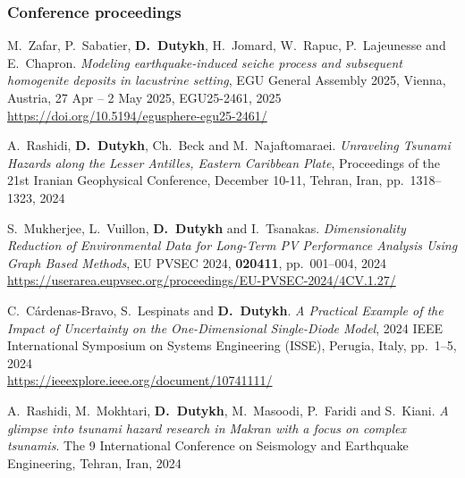 \documentclass[final, a4paper, oneside, 12pt]{article}
\numberwithin{equation}{section}
\begin{document}
\subsubsection{Conference proceedings}

\begin{etaremune}



  \item M.~Zafar, P.~Sabatier, \textbf{D.~Dutykh}, H.~Jomard, W.~Rapuc, P.~Lajeunesse and E.~Chapron. \textit{Modeling earthquake-induced seiche process and subsequent homogenite deposits in lacustrine setting}, EGU General Assembly 2025, Vienna, Austria, 27 Apr -- 2 May 2025, EGU25-2461, 2025 \\
  \url{https://doi.org/10.5194/egusphere-egu25-2461/}
  


  \item A.~Rashidi, \textbf{D.~Dutykh}, Ch.~Beck and M.~Najaftomaraei. \textit{Unraveling Tsunami Hazards along the Lesser Antilles, Eastern Caribbean Plate}, Proceedings of the 21st Iranian Geophysical Conference, December 10-11, Tehran, Iran, pp.~1318--1323, 2024 %

  \item S.~Mukherjee, L.~Vuillon, \textbf{D.~Dutykh} and I.~Tsanakas. \textit{Dimensionality Reduction of Environmental Data for Long-Term PV Performance Analysis Using Graph Based Methods}, EU PVSEC 2024, \textbf{020411}, pp.~001--004, 2024 \\
  \url{https://userarea.eupvsec.org/proceedings/EU-PVSEC-2024/4CV.1.27/}

  \item C.~C\'ardenas-Bravo, S.~Lespinats and \textbf{D.~Dutykh}. \textit{A Practical Example of the Impact of Uncertainty on the One-Dimensional Single-Diode Model}, 2024 IEEE International Symposium on Systems Engineering (ISSE), Perugia, Italy, pp.~1--5, 2024 \\
  \url{https://ieeexplore.ieee.org/document/10741111/}

  \item A.~Rashidi, M.~Mokhtari, \textbf{D.~Dutykh}, M.~Masoodi, P.~Faridi and S.~Kiani. \textit{A glimpse into tsunami hazard research in Makran with a focus on complex tsunamis}. The 9 International Conference on Seismology and Earthquake Engineering, Tehran, Iran, 2024 %


\end{etaremune}
\end{document}
